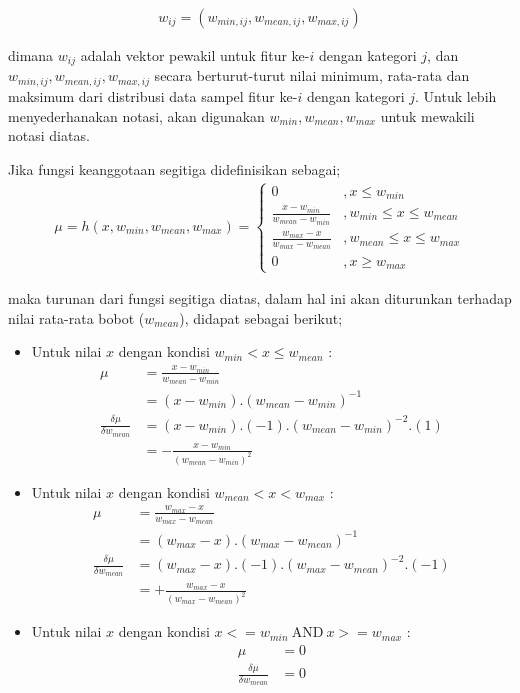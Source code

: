 \begin{align}
\label{eq:trimbobot}
	w_{ij} = (w_{min,ij}, w_{mean,ij}, w_{max,ij})
\end{align}

\noindent dimana $w_{ij}$ adalah vektor pewakil untuk fitur ke-$i$ dengan
kategori $j$, dan $w_{min,ij}, w_{mean,ij}, w_{max,ij}$ secara
berturut-turut nilai minimum, rata-rata dan maksimum dari distribusi data sampel
fitur ke-$i$ dengan kategori $j$. Untuk lebih menyederhanakan notasi, akan
digunakan $w_{min}, w_{mean}, w_{max}$ untuk mewakili notasi diatas.

\noindent Jika fungsi keanggotaan segitiga didefinisikan sebagai;
\begin{align}
\label{eq:trim}
	\mu = h(x, w_{min}, w_{mean}, w_{max}) = \left\{ 
	\begin{array}{ll}
	0 & , x \leq w_{min}\\
	\frac{x - w_{min}}{w_{mean} - w_{min}} & , w_{min} \leq x \leq w_{mean} \\
	\frac{w_{max} - x}{w_{max} - w_{mean}} & , w_{mean} \leq x \leq w_{max} \\
	0 & , x \geq w_{max}
	\end{array}
\end{align}
 
\noindent maka turunan dari fungsi segitiga diatas, dalam hal ini akan
diturunkan terhadap nilai rata-rata bobot ($w_{mean}$), didapat sebagai berikut;
\begin{itemize}
  \item Untuk nilai $x$ dengan kondisi $w_{min} < x \leq w_{mean}$ :
  \begin{align}
	\label{eq:trim1}
		\mu &= \frac{x - w_{min}}{w_{mean} - w_{min}} \nonumber \\
			&= (x - w_{min}) . (w_{mean} - w_{min})^{-1} \nonumber \\
		\frac{\delta \mu}{\delta w_{mean}} &=
		(x - w_{min}).(-1).(w_{mean} - w_{min})^{-2}.(1) \nonumber \\
		 &=
		- \frac{x - w_{min}}{(w_{mean} - w_{min})^2}
	\end{align}

	\item Untuk nilai $x$ dengan kondisi  $w_{mean} < x < w_{max}$ :
	\begin{align}
	\label{eq:trim2}
		\mu &= \frac{w_{max} - x}{w_{max} - w_{mean}} \nonumber \\
			&= (w_{max} - x) . (w_{max} - w_{mean})^{-1} \nonumber \\
		\frac{\delta \mu}{\delta w_{mean}} &=
		(w_{max} - x).(-1).(w_{max} - w_{mean})^{-2}.(-1) \nonumber \\
		 &=
		+ \frac{w_{max} - x}{(w_{max} - w_{mean})^2}
	\end{align}
	
	\item Untuk nilai $x$ dengan kondisi $x <= w_{min}\ \text{AND}\ x >= w_{max}$ :
	\begin{align}
	\label{eq:trim3}
		\mu &= 0 \nonumber \\
		\frac{\delta \mu}{\delta w_{mean}} &= 0
	\end{align}
\end{itemize}

